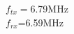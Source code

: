 \documentclass[preview]{standalone}
\begin{document}
\begin{center}
$f_{tx}=$6.79MHz\\$f_{rx}$=6.59MHz
\end{center}
\end{document}
